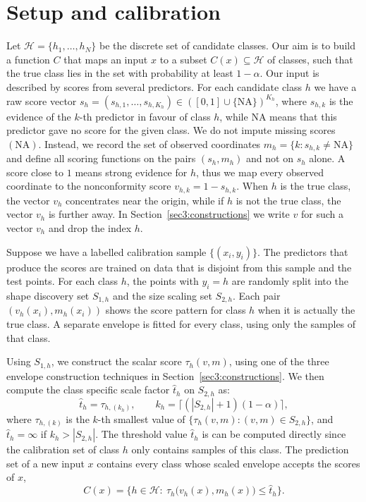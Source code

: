 \section{Setup and calibration}\label{sec:setup}

Let $\mathcal H=\{h_1,\dots,h_N\}$ be the discrete set of candidate classes. Our aim is to build a function $C$ that maps an 
input $x$ to a subset $C(x)\subseteq\mathcal H$ of classes, such that the true class lies in the set with probability at least 
$1-\alpha$. Our input is described by scores from several predictors. For each candidate class $h$ we have a raw score vector 
$s_h=(s_{h,1},\dots,s_{h,K_h})\in([0,1]\cup\{\mathrm{NA}\})^{K_h}$, where $s_{h,k}$ is the evidence of the $k$-th predictor in 
favour of class $h$, while $\mathrm{NA}$ means that this predictor gave no score for the given class. We do not impute missing 
scores $(\mathrm{NA})$. Instead, we record the set of observed coordinates $m_h=\{k:s_{h,k}\neq\mathrm{NA}\}$ and define all 
scoring functions on the pairs $(s_h,m_h)$ and not on $s_h$ alone. A score close to $1$ means strong evidence for $h$, thus we 
map every observed coordinate to the nonconformity score $v_{h,k}=1-s_{h,k}$. When $h$ is the true class, the vector $v_h$ 
concentrates near the origin, while if $h$ is not the true class, the vector $v_h$ is further away. In 
Section~\ref{sec3:constructions} we write $v$ for such a vector $v_h$ and drop the index $h$.

Suppose we have a labelled calibration sample $\{(x_i,y_i)\}$. The predictors that produce the scores are trained on data that 
is disjoint from this sample and the test points. For each class $h$, the points with $y_i=h$ are randomly split into the shape  
discovery set $S_{1,h}$ and the size scaling set $S_{2,h}$. Each pair $(v_h(x_i),m_h(x_i))$ shows the score pattern for class 
$h$ when it is actually the true class. A separate envelope is fitted for every class, using only the samples of that class.

Using $S_{1,h}$, we construct the scalar score $\tau_h(v,m)$, using one of the three envelope construction techniques in 
Section~\ref{sec3:constructions}. We then compute the class specific scale factor $\hat t_h$ on $S_{2,h}$ as:
\begin{equation}\label{eq:qhat}
\hat t_h=\tau_{h,(k_h)},\qquad k_h=\lceil(|S_{2,h}|+1)(1-\alpha)\rceil,
\end{equation}
where $\tau_{h,(k)}$ is the $k$-th smallest value of $\{\tau_h(v,m):(v,m)\in S_{2,h}\}$, and $\hat t_h=\infty$ if 
$k_h>|S_{2,h}|$. The threshold value $\hat t_h$ is can be computed directly since the calibration set of class $h$ only contains 
samples of this class. The prediction set of a new input $x$ contains every class whose scaled envelope accepts the scores of $x$,
\begin{equation}\label{eq:set}
C(x)=\bigl\{h\in\mathcal H:\ \tau_h\bigl(v_h(x),m_h(x)\bigr)\le\hat t_h\bigr\}.
\end{equation}

